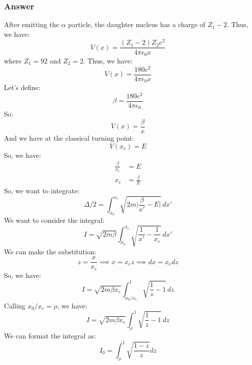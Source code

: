 \documentclass{article}
\begin{document}
\subsubsection{Answer}
After emitting the \( \alpha \) particle, the daughter nucleus has a charge of \( Z_1 - 2 \). Thus, we have:
\begin{equation}
    V(x) = \frac{(Z_1 - 2)Z_2e^2}{4\pi \epsilon_0 x}
\end{equation}
where \( Z_1 = 92 \) and \( Z_2 = 2 \). Thus, we have:
\begin{equation}
    V(x) = \frac{180e^2}{4\pi \epsilon_0 x}
\end{equation}
Let's define:
\begin{equation}
    \beta = \frac{180e^2}{4\pi \epsilon_0}
\end{equation}
So:
\begin{equation}
    V(x) = \frac{\beta}{x}
\end{equation}
And we have at the classical turning point:
\begin{equation}
    V(x_e) = E
\end{equation}
So, we have:
\begin{align}
    \frac{\beta}{x_e} &= E \\
    x_e &= \frac{\beta}{E}
\end{align}
So, we want to integrate:
\begin{equation}
    \Delta/2 = \int_{x_0}^{x_e} \sqrt{2m\lvert \frac{\beta}{x'} - E \rvert}\,dx'
\end{equation}
We want to consider the integral:
\begin{equation}
    I = \sqrt{2m\beta }\int_{x_0}^{x_e}\sqrt{\frac{1}{x'}-\frac{1}{x_e}}\,dx'
\end{equation}
We can make the substitution:
\begin{equation}
    z=\frac{x}{x_e} \implies x = x_e z \implies dx = x_e dz
\end{equation}
So, we have:
\begin{equation}
    I = \sqrt{2m\beta x_e}\int_{x_0/x_e}^{1}\sqrt{\frac{1}{z}-1}\,dz
\end{equation}
Calling $x_0/x_e = \rho$, we have:
\begin{equation}
    I = \sqrt{2m\beta x_e}\int_{\rho}^{1}\sqrt{\frac{1}{z}-1}\,dz
\end{equation}
We can format the integral as:
\begin{equation}
    I_0 = \int_{\rho }^{1}\sqrt{\frac{1-z}{z}} dz
\end{equation}
\end{document}
